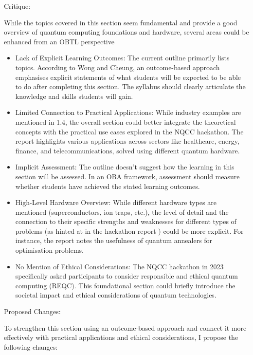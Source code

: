 \documentclass[11pt,a4paper]{article}
\begin{document}
Critique:

While the topics covered in this section seem fundamental and provide a good overview of quantum computing foundations and hardware, several areas could be enhanced from an OBTL perspective

	\begin{itemize}
		
	\item Lack of Explicit Learning Outcomes: The current outline primarily lists topics. According to Wong and Cheung, an outcome-based approach emphasises explicit statements of what students will be expected to be able to do after completing this section. The syllabus should clearly articulate the knowledge and skills students will gain.

	\item Limited Connection to Practical Applications: While industry examples are mentioned in 1.4, the overall section could better integrate the theoretical concepts with the practical use cases explored in the NQCC hackathon. The report highlights various applications across sectors like healthcare, energy, finance, and telecommunications, solved using different quantum hardware.

	\item Implicit Assessment: The outline doesn't suggest how the learning in this section will be assessed. In an OBA framework, assessment should measure whether students have achieved the stated learning outcomes.

	\item High-Level Hardware Overview: While different hardware types are mentioned (superconductors, ion traps, etc.), the level of detail and the connection to their specific strengths and weaknesses for different types of problems (as hinted at in the hackathon report
) could be more explicit. For instance, the report notes the usefulness of quantum annealers for optimisation problems.

	\item No Mention of Ethical Considerations: The NQCC hackathon in 2023 specifically asked participants to consider responsible and ethical quantum computing (REQC). This foundational section could briefly introduce the societal impact and ethical considerations of quantum technologies.

\end{itemize}

Proposed Changes:

To strengthen this section using an outcome-based approach and connect it more effectively with practical applications and ethical considerations, I propose the following changes:
\end{document}
